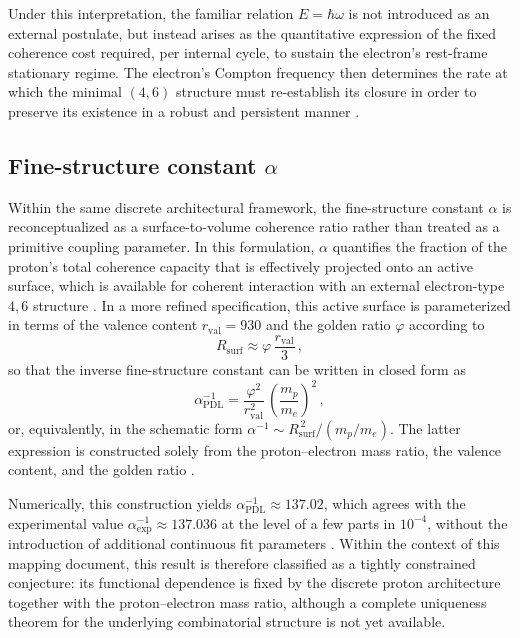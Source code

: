 \documentclass[11pt,a4paper]{article}
\begin{document}
Under this interpretation, the familiar relation \(E = \hbar \omega\) is not introduced as an external postulate, but instead arises as the quantitative expression of the fixed coherence cost required, per internal cycle, to sustain the electron’s rest-frame stationary regime. The electron’s Compton frequency then determines the rate at which the minimal \((4,6)\) structure must re-establish its closure in order to preserve its existence in a robust and persistent manner
\citep{PDL_Main_2026,PDL_position}.

\subsection{Fine-structure constant \texorpdfstring{\(\alpha\)}{alpha}}
\label{subsec:alpha}

Within the same discrete architectural framework, the fine-structure constant \(\alpha\) is reconceptualized as a surface-to-volume coherence ratio rather than treated as a primitive coupling parameter. In this formulation, \(\alpha\) quantifies the fraction of the proton’s total coherence capacity that is effectively projected onto an active surface, which is available for coherent interaction with an external electron-type \(4,6\) structure \citep{PDL_intro,PDL_Main_2026}. In a more refined specification, this active surface is parameterized in terms of the valence content
\(r_{\mathrm{val}} = 930\) and the golden ratio \(\varphi\) according to
\[
  R_{\mathrm{surf}} \approx \varphi \,\frac{r_{\mathrm{val}}}{3} \, ,
\]
so that the inverse fine-structure constant can be written in closed form as
\[
  \alpha^{-1}_{\mathrm{PDL}} = \frac{\varphi^{2}}{r_{\mathrm{val}}^{2}}\,\left(\frac{m_p}{m_e}\right)^{2} \, ,
\]
or, equivalently, in the schematic form \(\alpha^{-1} \sim R_{\mathrm{surf}}^{\,2}/(m_p/m_e)\). The latter expression is constructed solely from the proton–electron mass ratio, the valence content, and the golden ratio \citep{Alpha_PDL_v2_2026,Born_Golden_v2_2026}.

Numerically, this construction yields \(\alpha^{-1}_{\mathrm{PDL}} \approx 137.02\), which agrees with the experimental value \(\alpha^{-1}_{\mathrm{exp}} \approx 137.036\) at the level of a few parts in \(10^{-4}\), without the introduction of additional continuous fit parameters \citep{Alpha_PDL_v2_2026,PDL_intro}. Within the context of this mapping document, this result is therefore classified as a tightly constrained conjecture: its functional dependence is fixed by the discrete proton architecture together with the proton–electron mass ratio, although a complete uniqueness theorem for the underlying combinatorial structure is not yet available. 
\end{document}
